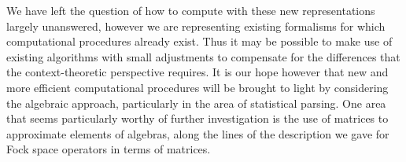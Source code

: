 We have left the question of how to compute with these new representations largely unanswered, however we are representing existing formalisms for which computational procedures already exist. Thus it may be possible to make use of existing algorithms with small adjustments to compensate for the differences that the context-theoretic perspective requires. It is our hope however that new and more efficient computational procedures will be brought to light by considering the algebraic approach, particularly in the area of statistical parsing. One area that seems particularly worthy of further investigation is the use of matrices to approximate elements of algebras, along the lines of the description we gave for Fock space operators in terms of matrices.


%
%
%

%
%

